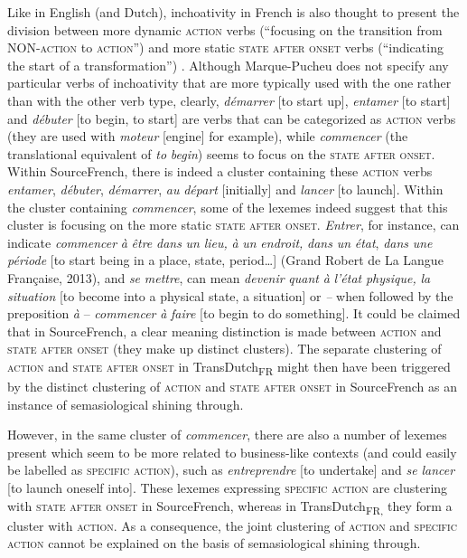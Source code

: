 Like in English (and Dutch), inchoativity in French is also thought to present the division between more dynamic \textsc{action} verbs (“focusing on the transition from NON-\textsc{action} to \textsc{action}”) and more static \textsc{state after onset} verbs (“indicating the start of a transformation”) \citep[241]{vogeleer_linchoatif:_1999}. Although Marque-Pucheu does not specify any particular verbs of inchoativity that are more typically used with the one rather than with the other verb type, clearly, \textit{démarrer} [to start up], \textit{entamer} [to start] and \textit{débuter} [to begin, to start] are verbs that can be categorized as \textsc{action} verbs (they are used with \textit{moteur} [engine] for example), while \textit{commencer} (the translational equivalent of \textit{to} \textit{begin}) seems to focus on the \textsc{state after onset}. Within SourceFrench, there is indeed a cluster containing these \textsc{action} verbs \textit{entamer}, \textit{débuter}, \textit{démarrer}, \textit{au} \textit{départ} [initially] and \textit{lancer} [to launch]. Within the cluster containing \textit{commencer}, some of the lexemes indeed suggest that this cluster is focusing on the more static \textsc{state after onset}. \textit{Entrer}, for instance, can indicate \textit{commencer} \textit{à} \textit{être} \textit{dans} \textit{un} \textit{lieu,} \textit{à} \textit{un} \textit{endroit,} \textit{dans} \textit{un} \textit{état}, \textit{dans} \textit{une} \textit{période} [to start being in a place, state, period…] (Grand Robert de La Langue Française, 2013), and \textit{se} \textit{mettre}, can mean \textit{devenir} \textit{quant} \textit{à} \textit{l'état} \textit{physique,} \textit{la} \textit{situation} [to become into a physical state, a situation] or \textit{–} when followed by the preposition \textit{à} – \textit{commencer} \textit{à} \textit{faire} [to begin to do something]. It could be claimed that in SourceFrench, a clear meaning distinction is made between \textsc{action} and \textsc{state after onset} (they make up distinct clusters). The separate clustering of \textsc{action} and \textsc{state after onset} in TransDutch\textsubscript{FR} might then have been triggered by the distinct clustering of \textsc{action} and \textsc{state after onset} in SourceFrench as an instance of semasiological shining through.

However, in the same cluster of \textit{commencer}, there are also a number of lexemes present which seem to be more related to business-like contexts (and could easily be labelled as {\textsc{specific}} \textsc{action}), such as \textit{entreprendre} [to undertake] and \textit{se} \textit{lancer} [to launch oneself into]. These lexemes expressing {\textsc{specific}} \textsc{action} are clustering with \textsc{state after onset} in SourceFrench, whereas in TransDutch\textsubscript{FR,} they form a cluster with \textsc{action}. As a consequence, the joint clustering of \textsc{action} and {\textsc{specific}} \textsc{action} cannot be explained on the basis of semasiological shining through.

